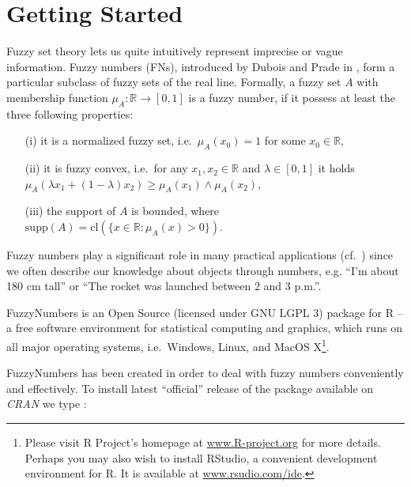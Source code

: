 \documentclass[11pt]{article}\usepackage[]{graphicx}\usepackage[]{color}
\newcommand{\package}[1]{\textsf{#1}\xspace}
\newcommand{\program}[1]{\textsf{#1}\xspace}
\newcommand{\os}[1]{\textsf{#1}\xspace}
\newcommand{\lang}[1]{\textsf{#1}\xspace}
\newcommand{\R}{\lang{R}}
\newif\ifDevelopmentVersion
\begin{document}
\section{Getting Started}

Fuzzy set theory lets us quite intuitively represent
imprecise or vague information. Fuzzy numbers (FNs), introduced
by Dubois and Prade in \cite{DuboisPrade1978:opfn}, form a particular
subclass of fuzzy sets of the real line.
Formally, a fuzzy set $A$
with membership function $\mu_A:\mathbb{R}\to[0,1]$
is a fuzzy number, if it possess at least the three following properties:
\begin{itemize}
\item[(i)] it is a normalized fuzzy set,
i.e.~$\mu_A(x_0)=1$ for some $x_0\in\mathbb{R}$,
\item[(ii)] it is fuzzy convex, i.e.~for any $x_1,x_2\in\mathbb{R}$
and $\lambda\in[0,1]$ it holds
$\mu_A(\lambda x_1 + (1-\lambda) x_2) \ge \mu_A(x_1)\wedge \mu_A(x_2)$,
\item[(iii)] the support of $A$ is bounded,
where $\mathrm{supp}(A) = \mathrm{cl}(\{x\in\mathbb{R}: \mu_A(x)>0\})$.
\end{itemize}
Fuzzy numbers play a significant role
in many practical applications
(cf.~\cite{KlirYuan1995:fuzzybook})
since we often describe our knowledge about objects
through numbers, e.g. ``I'm about 180 cm tall''
or ``The rocket was launched between 2 and 3 p.m.''.




\bigskip
\package{FuzzyNumbers} is an Open Source (licensed under GNU LGPL 3)
package for \R{} -- a free software environment
for statistical computing and graphics, which
runs on all major operating systems, i.e.~\os{Windows},
\os{Linux}, and \os{MacOS X}\footnote{%
Please visit \R Project's homepage at \href{http://www.R-project.org}{www.R-project.org}
for more details.
Perhaps you may also wish to install  \program{RStudio},
a convenient development environment for \R.
It is available at \href{http://www.rstudio.com/ide/}{www.rsudio.com/ide}.}.


\package{FuzzyNumbers} has been created in order to deal with fuzzy numbers
conveniently and effectively.
To install latest ``official'' release of the
package available on \textit{CRAN} we type%
\ifDevelopmentVersion%
\footnote{You are viewing the \textbf{development} version of the tutorial.
Some of the features presented in this document may be missing
in the current \textit{CRAN} release. Please, upgrade to the \textbf{latest} development version from
\href{https://github.com/gagolews/FuzzyNumbers}{\textit{GitHub}}
if you need the new functionality.}\ignorespaces
\fi%
:
\end{document}
